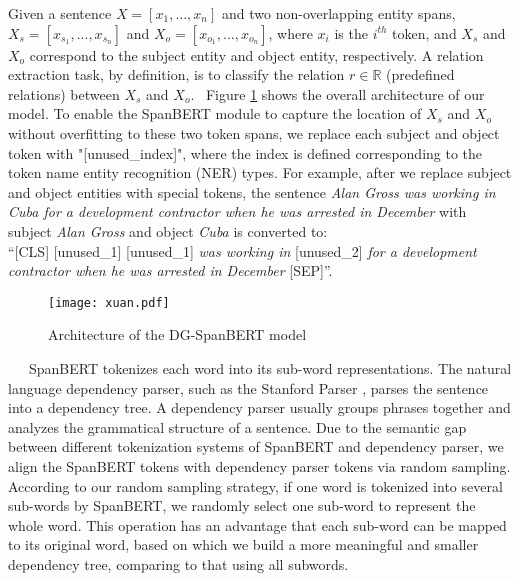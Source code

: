 \documentclass{article}
\begin{document}
Given a sentence $X =[x_1,...,x_n]$ and two non-overlapping entity spans, $X_s = [x_{s_1},...,x_{s_n}]$ and $X_o = [x_{o_1},...,x_{o_n}]$, where $x_i$ is the $i^{th}$ token, and $X_s$ and $X_o$ correspond to the subject entity and object entity, respectively. A relation extraction task, by definition, is to classify the relation $r \in \mathbb{R}$ (predefined relations) between $X_s$ and $X_o$. 
\
Figure \ref{fig:figure1} shows the overall architecture of our model. To enable the SpanBERT module to capture the location of $X_s$ and $X_o$ without overfitting to  these two token spans, we replace each subject and object token with "[unused\_index]", where the index is defined corresponding to the token name entity recognition (NER) types. For example, after we replace subject and object entities with special tokens, the sentence \emph{Alan Gross was working in Cuba for a development contractor when he was arrested in December} with subject \emph{Alan Gross} and object \emph{Cuba} is converted to:\\
``[CLS] [unused\_1] [unused\_1] \emph{was working in} [unused\_2] \emph{for a development contractor when he was arrested in December} [SEP]''.
\
\
\begin{figure}[t]
\centering
    \texttt{[image: xuan.pdf]}
\caption{Architecture of the DG-SpanBERT model}
\label{fig:figure1}
\end{figure}
\
\
\
SpanBERT tokenizes each word into its sub-word representations. The natural language dependency parser, such as the Stanford Parser \cite{socher2013parsing}, parses the sentence into a dependency tree. A dependency parser usually groups phrases together and analyzes the grammatical structure of a sentence. Due to the semantic gap between different tokenization systems of SpanBERT and dependency parser, we align the SpanBERT tokens with dependency parser tokens via random sampling. According to our random sampling strategy, if one word is tokenized into several sub-words by SpanBERT, we  randomly select one sub-word to represent the whole word. This operation has an advantage that each sub-word can be mapped to its original word, based on which we build a more meaningful and smaller dependency tree, comparing to that using all subwords.  
\end{document}
